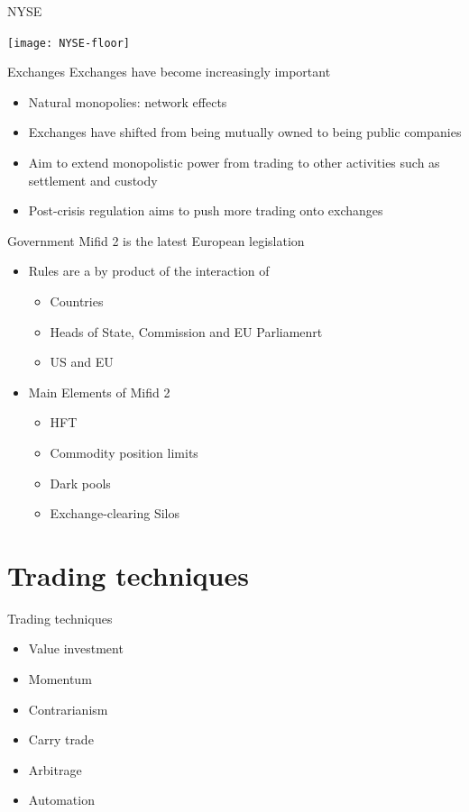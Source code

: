 \documentclass[14pt,xcolor=pdftex,dvipsnames,table]{beamer}\usepackage[]{graphicx}\usepackage[]{color}
\begin{document}
\begin{frame}{NYSE}
\begin{center}
\texttt{[image: NYSE-floor]}
\end{center}
\end{frame}

\begin{frame}{Exchanges}
Exchanges have become increasingly important
\pause
\begin{itemize}[<+-| alert@+>]
\item Natural monopolies: network effects
\item Exchanges have shifted from being mutually owned to being public companies
\item Aim to extend monopolistic power from trading to other activities such as settlement and custody
\item Post-crisis regulation aims to push more trading onto exchanges
\end{itemize}
\end{frame}

\begin{frame}{Government}
Mifid 2 is the latest European legislation
\pause
\begin{itemize}[<+-| alert@+>]
\item Rules are a by product of the interaction of 
\begin{itemize}
\item Countries
\item Heads of State, Commission and EU Parliamenrt
\item US and EU
\end{itemize}
\item Main Elements of Mifid 2
\begin{itemize}
\item HFT
\item Commodity position limits
\item Dark pools
\item Exchange-clearing Silos
\end{itemize}
\end{itemize}
\end{frame}

\section{Trading techniques}
\begin{frame}{Trading techniques}
\begin{itemize}
\item Value investment
\item Momentum
\item Contrarianism
\item Carry trade
\item Arbitrage
\item Automation
\end{itemize}
\end{frame}
\end{document}
